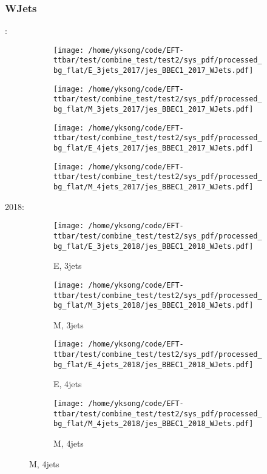 \documentclass{beamer}
\begin{document}
\begin{frame}
\frametitle{WJets}
\fontsize{5}{1}:
\begin{figure}
\centering
\begin{subfigure}[b]{0.24\textwidth}
\texttt{[image: /home/yksong/code/EFT-ttbar/test/combine\_test/test2/sys\_pdf/processed\_bg\_flat/E\_3jets\_2017/jes\_BBEC1\_2017\_WJets.pdf]}
\end{subfigure}
\begin{subfigure}[b]{0.24\textwidth}
\texttt{[image: /home/yksong/code/EFT-ttbar/test/combine\_test/test2/sys\_pdf/processed\_bg\_flat/M\_3jets\_2017/jes\_BBEC1\_2017\_WJets.pdf]}
\end{subfigure}
\begin{subfigure}[b]{0.24\textwidth}
\texttt{[image: /home/yksong/code/EFT-ttbar/test/combine\_test/test2/sys\_pdf/processed\_bg\_flat/E\_4jets\_2017/jes\_BBEC1\_2017\_WJets.pdf]}
\end{subfigure}
\begin{subfigure}[b]{0.24\textwidth}
\texttt{[image: /home/yksong/code/EFT-ttbar/test/combine\_test/test2/sys\_pdf/processed\_bg\_flat/M\_4jets\_2017/jes\_BBEC1\_2017\_WJets.pdf]}
\end{subfigure}
\end{figure}
2018:
\begin{figure}
\centering
\begin{subfigure}[b]{0.24\textwidth}
\texttt{[image: /home/yksong/code/EFT-ttbar/test/combine\_test/test2/sys\_pdf/processed\_bg\_flat/E\_3jets\_2018/jes\_BBEC1\_2018\_WJets.pdf]}
\captionsetup{font=tiny}
\caption{E, 3jets}
\end{subfigure}
\begin{subfigure}[b]{0.24\textwidth}
\texttt{[image: /home/yksong/code/EFT-ttbar/test/combine\_test/test2/sys\_pdf/processed\_bg\_flat/M\_3jets\_2018/jes\_BBEC1\_2018\_WJets.pdf]}
\captionsetup{font=tiny}
\caption{M, 3jets}
\end{subfigure}
\begin{subfigure}[b]{0.24\textwidth}
\texttt{[image: /home/yksong/code/EFT-ttbar/test/combine\_test/test2/sys\_pdf/processed\_bg\_flat/E\_4jets\_2018/jes\_BBEC1\_2018\_WJets.pdf]}
\captionsetup{font=tiny}
\caption{E, 4jets}
\end{subfigure}
\begin{subfigure}[b]{0.24\textwidth}
\texttt{[image: /home/yksong/code/EFT-ttbar/test/combine\_test/test2/sys\_pdf/processed\_bg\_flat/M\_4jets\_2018/jes\_BBEC1\_2018\_WJets.pdf]}
\captionsetup{font=tiny}
\caption{M, 4jets}
\end{subfigure}
\end{figure}
\end{frame}
\end{document}
